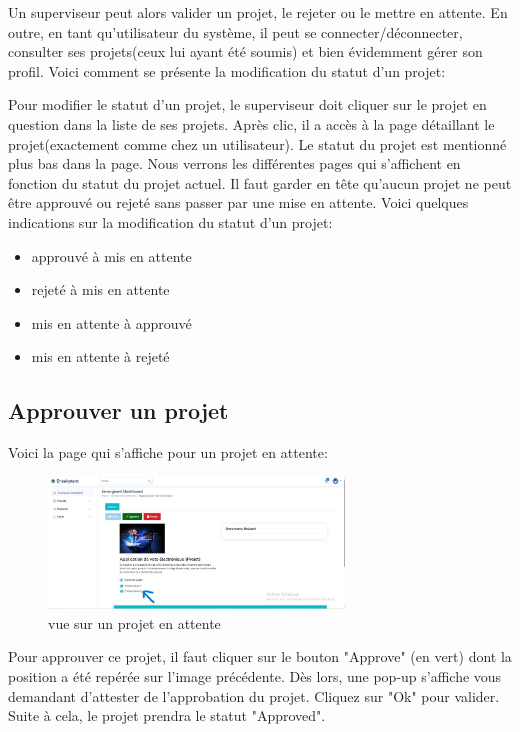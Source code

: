 \documentclass[12pt]{article}
\begin{document}
Un superviseur peut alors valider un projet, le rejeter ou le mettre en attente. En outre, en tant qu'utilisateur du système, il peut se connecter/déconnecter, consulter ses projets(ceux lui ayant été soumis) et bien évidemment gérer son profil. Voici comment se présente la modification du statut d'un projet:

\bigskip
Pour modifier le statut d'un projet, le superviseur doit cliquer sur le projet en question dans la liste de ses projets. Après clic, il a accès à la page détaillant le projet(exactement comme chez un utilisateur). Le statut du projet est mentionné plus bas dans la page. Nous verrons les différentes pages qui s'affichent en fonction du statut du projet actuel. Il faut garder en tête qu'aucun projet ne peut être approuvé ou rejeté sans passer par une mise en attente. Voici quelques indications sur la modification du statut d'un projet:
    \begin{itemize}
    \item approuvé à mis en attente
    \item rejeté à mis en attente
    \item mis en attente à approuvé
    \item mis en attente à rejeté
    \end{itemize}  

\medskip
\subsection{Approuver un projet}
Voici la page qui s'affiche pour un projet en attente:
    \begin{figure}[h!]
        \centering
        \includegraphics[width=0.7\textwidth]{images/pending.jpg}
        \caption{vue sur un projet en attente}
        \label{vue sur un projet en attente}
    \end{figure}

Pour approuver ce projet, il faut cliquer sur le bouton "Approve" (en vert) dont la position a été repérée sur l'image précédente. Dès lors, une pop-up s'affiche vous demandant d'attester de l'approbation du projet. Cliquez sur "Ok" pour valider. Suite à cela, le projet prendra le statut "Approved". 
\medskip
\end{document}
